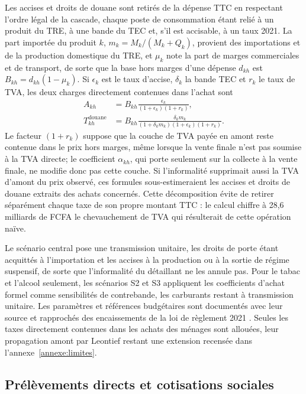 \documentclass[11pt,a4paper]{article}
\begin{document}
Les accises et droits de douane sont retirés de la dépense TTC en respectant
l'ordre légal de la cascade, chaque poste de consommation étant relié à un
produit du TRE, à une bande du TEC et, s'il est accisable, à un taux 2021. La
part importée du produit $k$, $m_k=M_k/(M_k+Q_k)$, provient des importations et
de la production domestique du TRE, et $\mu_k$ note la part de marges
commerciales et de transport, de sorte que la base hors marges d'une dépense
$d_{kh}$ est $B_{kh}=d_{kh}(1-\mu_k)$. Si $\epsilon_k$ est le taux d'accise,
$\delta_k$ la bande TEC et $r_k$ le taux de TVA, les deux charges directement
contenues dans l'achat sont
\begin{align}
A_{kh}&=B_{kh}\frac{\epsilon_k}{(1+\epsilon_k)(1+r_k)},\\
T^{\mathrm{douane}}_{kh}&=B_{kh}\frac{\delta_km_k}
 {(1+\delta_km_k)(1+\epsilon_k)(1+r_k)}.
\label{eq:other-indirect}
\end{align}
Le facteur $(1+r_k)$ suppose que la couche de TVA payée en amont reste contenue
dans le prix hors marges, même lorsque la vente finale n'est pas soumise à la
TVA directe; le coefficient $\alpha_{kh}$, qui porte seulement sur la collecte à
la vente finale, ne modifie donc pas cette couche. Si l'informalité supprimait
aussi la TVA d'amont du prix observé, ces formules sous-estimeraient les accises
et droits de douane extraits des achats concernés. Cette décomposition évite de
retirer séparément chaque taxe de son propre montant TTC : le calcul chiffre à
28,6 milliards de FCFA le chevauchement de TVA qui résulterait de cette
opération naïve.

Le scénario central pose une transmission unitaire, les droits de porte étant
acquittés à l'importation et les accises à la production ou à la sortie de
régime suspensif, de sorte que l'informalité du détaillant ne les annule pas.
Pour le tabac et l'alcool seulement, les scénarios S2 et S3 appliquent les
coefficients d'achat formel comme sensibilités de contrebande, les carburants
restant à transmission unitaire. Les paramètres et références budgétaires sont
documentés avec leur source et rapprochés des encaissements de la loi de
règlement 2021 \citep{civreglement2021}. Seules les taxes directement contenues
dans les achats des ménages sont allouées, leur propagation amont par Leontief
restant une extension recensée dans l'annexe~\ref{annexe:limites}.

\subsection{Prélèvements directs et cotisations sociales}
\end{document}
